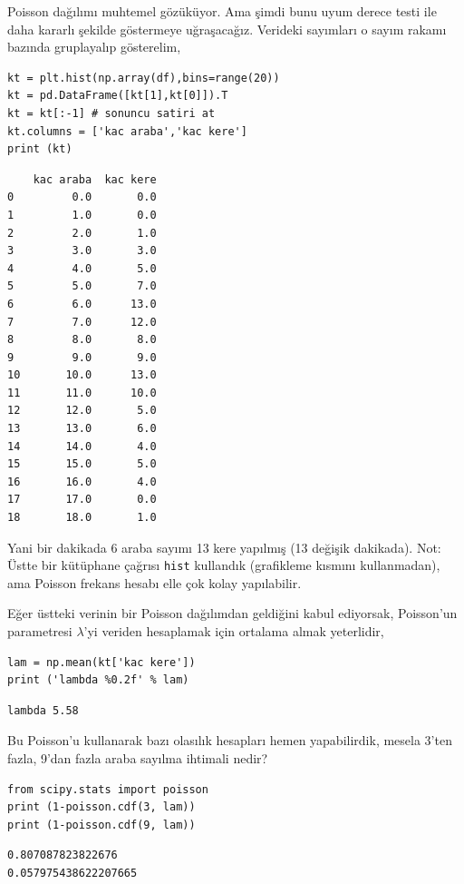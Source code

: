 \documentclass[12pt,fleqn]{article}\usepackage{../../common}
\begin{document}
Poisson dağılımı muhtemel gözüküyor. Ama şimdi bunu uyum derece testi ile
daha kararlı şekilde göstermeye uğraşacağız. Verideki sayımları o sayım
rakamı bazında gruplayalıp gösterelim,

\begin{verbatim}
kt = plt.hist(np.array(df),bins=range(20))
kt = pd.DataFrame([kt[1],kt[0]]).T
kt = kt[:-1] # sonuncu satiri at
kt.columns = ['kac araba','kac kere']
print (kt)
\end{verbatim}

\begin{verbatim}
    kac araba  kac kere
0         0.0       0.0
1         1.0       0.0
2         2.0       1.0
3         3.0       3.0
4         4.0       5.0
5         5.0       7.0
6         6.0      13.0
7         7.0      12.0
8         8.0       8.0
9         9.0       9.0
10       10.0      13.0
11       11.0      10.0
12       12.0       5.0
13       13.0       6.0
14       14.0       4.0
15       15.0       5.0
16       16.0       4.0
17       17.0       0.0
18       18.0       1.0
\end{verbatim}

Yani bir dakikada 6 araba sayımı 13 kere yapılmış (13 değişik dakikada).
Not: Üstte bir kütüphane çağrısı \verb!hist! kullandık (grafikleme kısmını
kullanmadan), ama Poisson frekans hesabı elle çok kolay yapılabilir.

Eğer üstteki verinin bir Poisson dağılımdan geldiğini kabul ediyorsak,
Poisson'un parametresi $\lambda$'yi veriden hesaplamak için ortalama
almak yeterlidir,

\begin{verbatim}
lam = np.mean(kt['kac kere'])
print ('lambda %0.2f' % lam)
\end{verbatim}

\begin{verbatim}
lambda 5.58
\end{verbatim}

Bu Poisson'u kullanarak bazı olasılık hesapları hemen yapabilirdik, mesela
3'ten fazla, 9'dan fazla araba sayılma ihtimali nedir?

\begin{verbatim}
from scipy.stats import poisson
print (1-poisson.cdf(3, lam))
print (1-poisson.cdf(9, lam))
\end{verbatim}

\begin{verbatim}
0.807087823822676
0.057975438622207665
\end{verbatim}
\end{document}
